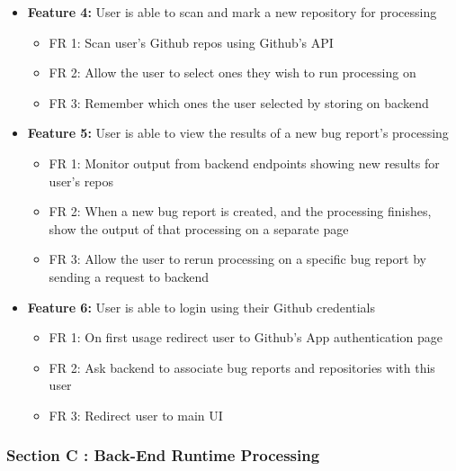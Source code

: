 \documentclass[11pt,]{article}
\providecommand{\tightlist}{%
  \setlength{\itemsep}{0pt}\setlength{\parskip}{0pt}}
\begin{document}
\begin{itemize}
\tightlist
\item
  \textbf{Feature 4:} User is able to scan and mark a new repository for
  processing

  \begin{itemize}
  \tightlist
  \item
    FR 1: Scan user's Github repos using Github's API
  \item
    FR 2: Allow the user to select ones they wish to run processing on
  \item
    FR 3: Remember which ones the user selected by storing on backend
  \end{itemize}
\item
  \textbf{Feature 5:} User is able to view the results of a new bug
  report's processing

  \begin{itemize}
  \tightlist
  \item
    FR 1: Monitor output from backend endpoints showing new results for
    user's repos
  \item
    FR 2: When a new bug report is created, and the processing finishes,
    show the output of that processing on a separate page
  \item
    FR 3: Allow the user to rerun processing on a specific bug report by
    sending a request to backend
  \end{itemize}
\item
  \textbf{Feature 6:} User is able to login using their Github
  credentials

  \begin{itemize}
  \tightlist
  \item
    FR 1: On first usage redirect user to Github's App authentication
    page
  \item
    FR 2: Ask backend to associate bug reports and repositories with
    this user
  \item
    FR 3: Redirect user to main UI
  \end{itemize}
\end{itemize}

\hypertarget{section-c-back-end-runtime-processing}{%
\subsubsection{Section C : Back-End Runtime
Processing}\label{section-c-back-end-runtime-processing}}
\end{document}
